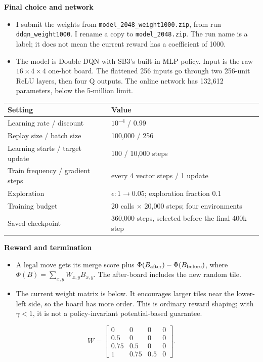 \documentclass[a4paper]{article}
\begin{document}
\newpage
\begin{answer}
\textbf{Final choice and network}
\begin{itemize}
\item I submit the weights from \texttt{model\_2048\_weight1000.zip}, from run \texttt{ddqn\_weight1000}. I rename a copy to \texttt{model\_2048.zip}. The run name is a label; it does not mean the current reward has a coefficient of 1000.
\item The model is Double DQN with SB3's built-in MLP policy. Input is the raw $16\times4\times4$ one-hot board. The flattened 256 inputs go through two 256-unit ReLU layers, then four Q outputs. The online network has 132,612 parameters, below the 5-million limit.
\end{itemize}
\begin{center}\small\begin{tabular}{ll}\toprule
Setting & Value\\\midrule
Learning rate / discount & $10^{-4}$ / 0.99\\
Replay size / batch size & 100,000 / 256\\
Learning starts / target update & 100 / 10,000 steps\\
Train frequency / gradient steps & every 4 vector steps / 1 update\\
Exploration & $\epsilon:1\to0.05$; exploration fraction 0.1\\
Training budget & 20 calls $\times$ 20,000 steps; four environments\\
Saved checkpoint & 360,000 steps, selected before the final 400k step\\
\bottomrule\end{tabular}\end{center}
\textbf{Reward and termination}
\begin{itemize}
\item A legal move gets its merge score plus $\Phi(B_{\rm after})-\Phi(B_{\rm before})$, where $\Phi(B)=\sum_{x,y}W_{x,y}B_{x,y}$. The after-board includes the new random tile.
\item The current weight matrix is below. It encourages larger tiles near the lower-left side, so the board has more order. This is ordinary reward shaping; with $\gamma<1$, it is not a policy-invariant potential-based guarantee.
\end{itemize}
\[
W=\begin{bmatrix}0&0&0&0\\0.5&0&0&0\\0.75&0.5&0&0\\1&0.75&0.5&0\end{bmatrix}.
\]
\end{answer}
\end{document}
